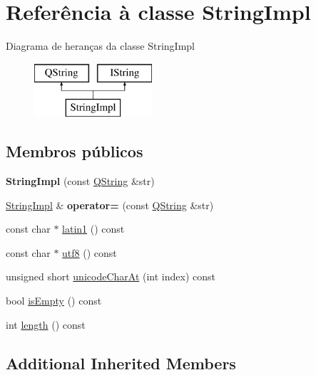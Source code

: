 \hypertarget{class_string_impl}{\section{Referência à classe String\-Impl}
\label{class_string_impl}
}
Diagrama de heranças da classe String\-Impl\begin{figure}[H]
\begin{center}
\leavevmode
\includegraphics[height=2.000000cm]{class_string_impl}
\end{center}
\end{figure}
\subsection*{Membros públicos}
\begin{DoxyCompactItemize}
\item 
\hypertarget{class_string_impl_a075d2d08703ebf6bda5337a22375ad6a}{{\bfseries String\-Impl} (const \hyperlink{class_q_string}{Q\-String} \&str)}\label{class_string_impl_a075d2d08703ebf6bda5337a22375ad6a}

\item 
\hypertarget{class_string_impl_ab69df6b5855966dc74a4b08476d1e609}{\hyperlink{class_string_impl}{String\-Impl} \& {\bfseries operator=} (const \hyperlink{class_q_string}{Q\-String} \&str)}\label{class_string_impl_ab69df6b5855966dc74a4b08476d1e609}

\item 
const char $\ast$ \hyperlink{class_string_impl_a09fbe42f18f9a02a40c43f16441d91fe}{latin1} () const 
\item 
const char $\ast$ \hyperlink{class_string_impl_aa12de8c3161c3670af576c0bcbf2ea6f}{utf8} () const 
\item 
unsigned short \hyperlink{class_string_impl_aa6da5680d890fcccd1d5086b07d1c348}{unicode\-Char\-At} (int index) const 
\item 
bool \hyperlink{class_string_impl_a479432127ee77145cc19d6a2d1590821}{is\-Empty} () const 
\item 
int \hyperlink{class_string_impl_a57b988236ee6a3a5e572d126d3fbccc1}{length} () const 
\end{DoxyCompactItemize}
\subsection*{Additional Inherited Members}


